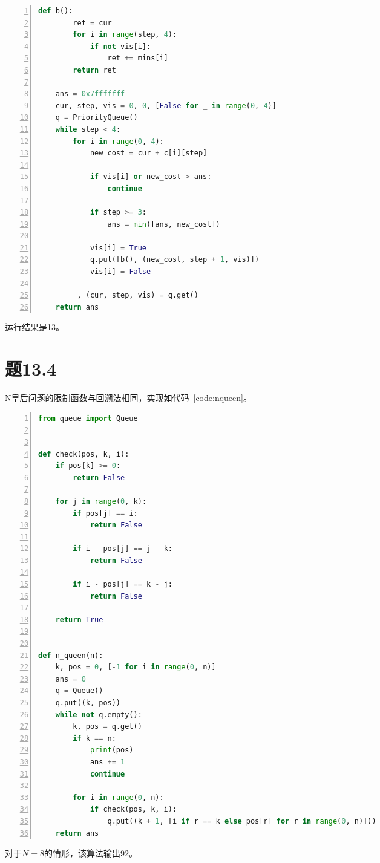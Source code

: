 \documentclass[a4paper,twoside]{article}
\begin{document}
\begin{spacing}{1.2}
\begin{lstlisting}[language=Python,numbers=left,style=PythonStyle,caption=工人分配问题,label={code:assign}]
    def b():
        ret = cur
        for i in range(step, 4):
            if not vis[i]:
                ret += mins[i]
        return ret

    ans = 0x7fffffff
    cur, step, vis = 0, 0, [False for _ in range(0, 4)]
    q = PriorityQueue()
    while step < 4:
        for i in range(0, 4):
            new_cost = cur + c[i][step]

            if vis[i] or new_cost > ans:
                continue

            if step >= 3:
                ans = min([ans, new_cost])

            vis[i] = True
            q.put([b(), (new_cost, step + 1, vis)])
            vis[i] = False

        _, (cur, step, vis) = q.get()
    return ans
\end{lstlisting}

运行结果是13。

\section{题13.4}

N皇后问题的限制函数与回溯法相同，实现如代码~\ref{code:nqueen}。

\begin{lstlisting}[language=Python,numbers=left,style=PythonStyle,caption=N皇后问题,label={code:nqueen}]
from queue import Queue


def check(pos, k, i):
    if pos[k] >= 0:
        return False

    for j in range(0, k):
        if pos[j] == i:
            return False

        if i - pos[j] == j - k:
            return False

        if i - pos[j] == k - j:
            return False

    return True


def n_queen(n):
    k, pos = 0, [-1 for i in range(0, n)]
    ans = 0
    q = Queue()
    q.put((k, pos))
    while not q.empty():
        k, pos = q.get()
        if k == n:
            print(pos)
            ans += 1
            continue

        for i in range(0, n):
            if check(pos, k, i):
                q.put((k + 1, [i if r == k else pos[r] for r in range(0, n)]))
    return ans
\end{lstlisting}

对于$N=8$的情形，该算法输出92。


\end{spacing}
\end{document}
